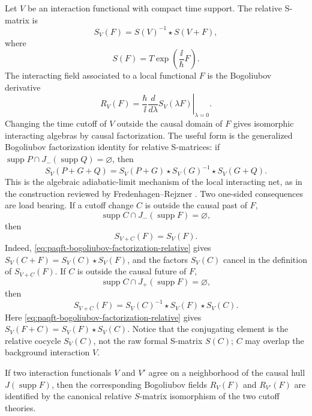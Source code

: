 Let \(V\) be an interaction functional with compact time support.  The
relative S-matrix is
\begin{equation}
  S_V(F)=S(V)^{-1}\star S(V+F),
  \label{eq:paqft-curved-relative-s-matrix}
\end{equation}
where
\[
  S(F)=T\exp\!\left(\frac{\ii}{\hbar}F\right).
\]
The interacting field associated to a local functional \(F\) is the
Bogoliubov derivative
\[
  R_V(F)
  =
  \left.\frac{\hbar}{\ii}\frac{d}{d\lambda}
  S_V(\lambda F)\right|_{\lambda=0}.
\]
Changing the time cutoff of \(V\) outside the causal domain of \(F\) gives
isomorphic interacting algebras by causal factorization.  The useful form is
the generalized Bogoliubov factorization identity for relative S-matrices:
if \(\operatorname{supp}P\cap J_-(\operatorname{supp}Q)=\varnothing\), then
\begin{equation}
  S_V(P+G+Q)
  =
  S_V(P+G)\star S_V(G)^{-1}\star S_V(G+Q).
  \label{eq:paqft-bogoliubov-factorization-relative}
\end{equation}
This is the algebraic adiabatic-limit mechanism of the local interacting net,
as in the construction reviewed by Fredenhagen--Rejzner
\cite[Sec.~4]{FredenhagenRejzner2015PerturbativeConstruction}.  Two
one-sided consequences are load bearing.  If a cutoff change \(C\) is outside
the causal past of \(F\),
\[
  \operatorname{supp}C\cap J_-(\operatorname{supp}F)=\varnothing,
\]
then
\begin{equation}
  S_{V+C}(F)=S_V(F).
  \label{eq:paqft-cutoff-outside-past}
\end{equation}
Indeed, \eqref{eq:paqft-bogoliubov-factorization-relative} gives
\(S_V(C+F)=S_V(C)\star S_V(F)\), and the factors \(S_V(C)\) cancel in the
definition of \(S_{V+C}(F)\).  If \(C\) is outside the causal future of \(F\),
\[
  \operatorname{supp}C\cap J_+(\operatorname{supp}F)=\varnothing,
\]
then
\begin{equation}
  S_{V+C}(F)
  =
  S_V(C)^{-1}\star S_V(F)\star S_V(C).
  \label{eq:paqft-cutoff-outside-future}
\end{equation}
Here \eqref{eq:paqft-bogoliubov-factorization-relative} gives
\(S_V(F+C)=S_V(F)\star S_V(C)\).  Notice that the conjugating element is the
relative cocycle \(S_V(C)\), not the raw formal S-matrix \(S(C)\); \(C\) may
overlap the background interaction \(V\).

\begin{proposition}
\label{prop:paqft-bogoliubov-causal-support}
If two interaction functionals \(V\) and \(V'\) agree on a neighborhood of
the causal hull \(J(\operatorname{supp}F)\), then the corresponding
Bogoliubov fields \(R_V(F)\) and \(R_{V'}(F)\) are identified by the
canonical relative \(S\)-matrix isomorphism of the two cutoff theories.
\end{proposition}

